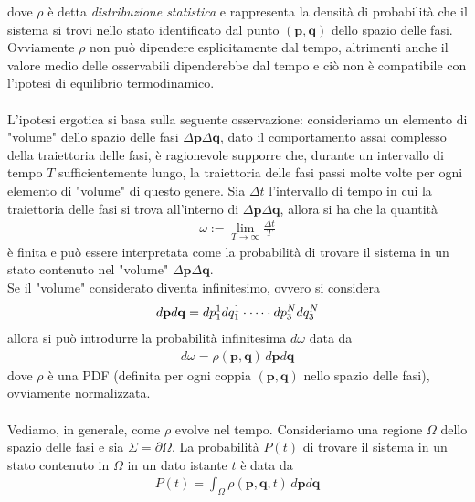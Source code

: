 \documentclass{article}
\begin{document}
dove $\rho$ è detta \textit{distribuzione statistica} e rappresenta la densità di probabilità che il sistema si trovi nello stato identificato dal punto $(\mathbf{p}, \mathbf{q})$ dello spazio delle fasi. Ovviamente $\rho$ non può dipendere esplicitamente dal tempo, altrimenti anche il valore medio delle osservabili dipenderebbe dal tempo e ciò non è compatibile con l'ipotesi di equilibrio termodinamico. \\ \\
L'ipotesi ergotica si basa sulla seguente osservazione: consideriamo un elemento di "volume" dello spazio delle fasi $\Delta\mathbf{p}\Delta\mathbf{q}$, dato il comportamento assai complesso della traiettoria delle fasi, è ragionevole supporre che, durante un intervallo di tempo $T$ sufficientemente lungo, la traiettoria delle fasi passi molte volte per ogni elemento di "volume" di questo genere. Sia $\Delta t$ l'intervallo di tempo in cui la traiettoria delle fasi si trova all'interno di $\Delta\mathbf{p}\Delta\mathbf{q}$, allora si ha che la quantità
\begin{gather}
    \omega := \lim_{T \rightarrow \infty} \frac{\Delta t}{T} \tag{1.1.4}
\end{gather}
è finita e può essere interpretata come la probabilità di trovare il sistema in un stato contenuto nel "volume" $\Delta\mathbf{p}\Delta\mathbf{q}$. \\
Se il "volume" considerato diventa infinitesimo, ovvero si considera
\begin{gather}
    d\mathbf{p}d\mathbf{q} = dp^1_1dq^1_1 \cdot \dots \cdot dp^N_3dq^N_3 \notag
\end{gather}
allora si può introdurre la probabilità infinitesima $d\omega$ data da
\begin{gather}
    d\omega = \rho(\mathbf{p}, \mathbf{q}) \, d\mathbf{p}d\mathbf{q} \tag{1.1.5}
\end{gather}
dove $\rho$ è una PDF (definita per ogni coppia $(\mathbf{p}, \mathbf{q})$ nello spazio delle fasi), ovviamente normalizzata. \\ \\
Vediamo, in generale, come $\rho$ evolve nel tempo. Consideriamo una regione $\Omega$ dello spazio delle fasi e sia $\Sigma = \partial \Omega$. La probabilità $P(t)$ di trovare il sistema in un stato contenuto in $\Omega$ in un dato istante $t$ è data da
\begin{gather}
    P(t) = \int_{\Omega}\rho(\mathbf{p}, \mathbf{q}, t) \, d\mathbf{p}d\mathbf{q} \tag{1.1.6}
\end{gather}
\end{document}
